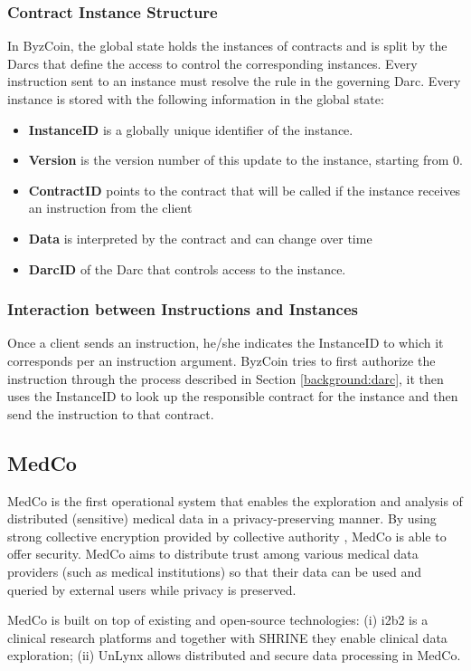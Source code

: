 \subsubsection{Contract Instance Structure}
In ByzCoin, the global state holds the instances of contracts and is split by the Darcs that define the access to control the corresponding instances. Every instruction sent to an instance must resolve the rule in the governing Darc. Every instance is stored with the following information in the global state:

\begin{itemize}
    \item \textbf{InstanceID} is a globally unique identifier of the instance.
    \item \textbf{Version} is the version number of this update to the instance, starting from 0.
    \item \textbf{ContractID} points to the contract that will be called if the instance receives an instruction from the client
    \item \textbf{Data} is interpreted by the contract and can change over time \item \textbf{DarcID} of the Darc that controls access to the instance.
\end{itemize}

\subsubsection{Interaction between Instructions and Instances}
Once a client sends an instruction, he/she indicates the InstanceID to which it corresponds per an instruction argument. ByzCoin tries to first authorize the instruction through the process described in Section \ref{background:darc}, it then uses the InstanceID to look up the responsible contract for the instance and then send the instruction to that contract. 

\subsection{MedCo}\label{background:medco}
MedCo \cite{raisaro2018medco} is the first operational system that enables the exploration and analysis of distributed (sensitive) medical data in a privacy-preserving manner. By using strong collective encryption provided by collective authority \cite{syta2015certificate}, MedCo is able to offer security. MedCo aims to distribute trust among various medical data providers (such as medical institutions) so that their data can be used and queried by external users while privacy is preserved. 

MedCo is built on top of existing and open-source technologies: (i) i2b2 \cite{murphy2010serving} is a clinical research platforms and together with SHRINE \cite{weber2009shared} they enable clinical data exploration; (ii) UnLynx \cite{froelicher2017unlynx} allows distributed and secure data processing in MedCo. 